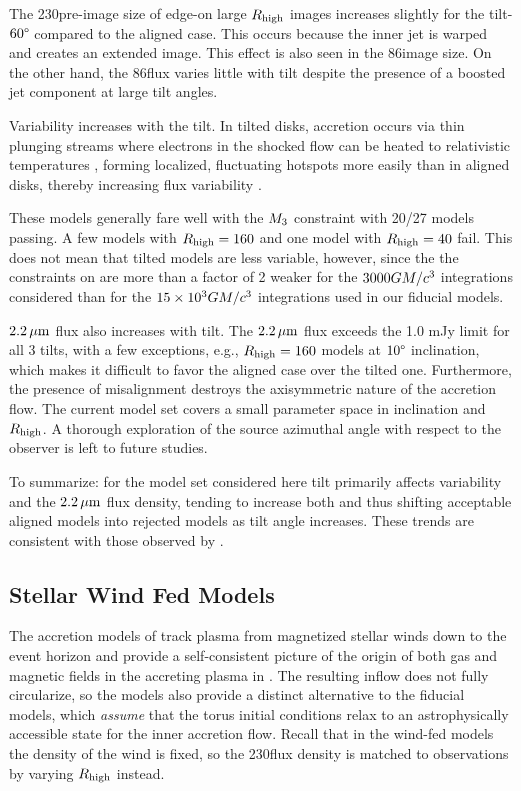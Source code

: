 The 230\GHz pre-image size of edge-on large $R_\mathrm{high}$ images increases slightly for the tilt-$60\degree$ compared to the aligned case.
This occurs because the inner jet is warped and creates an extended image.
This effect is also seen in the 86\GHz image size.
On the other hand, the 86\GHz flux varies little with tilt despite the presence of a boosted jet component at large tilt angles.

Variability increases with the tilt.
In tilted disks, accretion occurs via thin plunging streams \citep[e.g.,][]{Fragile2007} where electrons in the shocked flow can be heated to relativistic temperatures \citep[e.g.,][]{Dexter2013, 2014ApJ...780...81G, White2019}, forming localized, fluctuating hotspots more easily than in aligned disks, thereby increasing flux variability \citep{Chatterjee2020, 2021arXiv210412896W}.

These models generally fare well with the $M_{3}$ constraint with 20/27 models passing.
A few models with $R_\mathrm{high}=160$ and one model with $R_\mathrm{high}=40$ fail.
This does not mean that tilted models are less variable, however, since the the constraints on  are more than a factor of 2 weaker for the $3000GM/c^3$ integrations considered than for the $15 \times 10^3GM/c^3$ integrations used in our fiducial models.

$2.2\,\mu\mathrm{m}$ flux also increases with tilt.
The $2.2\,\mu\mathrm{m}$ flux exceeds the 1.0 mJy limit for all 3 tilts, with a few exceptions, e.g., $R_\mathrm{high}=160$ models at $10\degree$ inclination, which makes it difficult to favor the aligned case over the tilted one.
Furthermore, the presence of misalignment destroys the axisymmetric nature of the accretion flow.
The current model set covers a small parameter space in inclination and $R_\mathrm{high}$.
A thorough exploration of the source azimuthal angle with respect to the observer is left to future studies.

To summarize: for the model set considered here tilt primarily affects variability and the $2.2\,\mu\mathrm{m}$ flux density, tending to increase both and thus shifting acceptable aligned models into rejected models as tilt angle increases.
These trends are consistent with those observed by \cite{2021arXiv210412896W}.

\subsection{Stellar Wind Fed Models}

The accretion models of \cite{2020ApJ...896L...6R, 2020MNRAS.492.3272R, 2018MNRAS.478.3544R} track plasma from  magnetized stellar winds down to the event horizon and provide a self-consistent picture of the origin of both gas and magnetic fields in the accreting plasma in \sgra.
The resulting inflow does not fully circularize, so the models also provide a distinct alternative to the fiducial models, which {\em assume} that the torus initial conditions relax to an astrophysically accessible state for the inner accretion flow.
Recall that in the wind-fed models the density of the wind is fixed, so the 230\GHz flux density is matched to observations by varying $R_\mathrm{high}$ instead.

